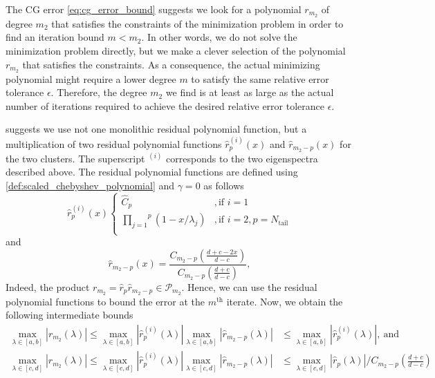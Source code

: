 The CG error \cref{eq:cg_error_bound} suggests we look for a polynomial $r_{m_2}$ of degree $m_2$ that satisfies the constraints of the minimization problem in order to find an iteration bound $m < m_2$. In other words, we do not solve the minimization problem directly, but we make a clever selection of the polynomial $r_{m_2}$ that satisfies the constraints. As a consequence, the actual minimizing polynomial might require a lower degree $m$ to satisfy the same relative error tolerance $\epsilon$. Therefore, the degree $m_2$ we find is at least as large as the actual number of iterations required to achieve the desired relative error tolerance $\epsilon$.

\citeauthor{cg_sharpened_convrate_Axelsson1976} suggests we use not one monolithic residual polynomial function, but a multiplication of two residual polynomial functions $\hat{r}^{(i)}_p(x)$ and $\hat{r}_{m_2-p}(x)$ for the two clusters. The superscript $^{(i)}$ corresponds to the two eigenspectra described above. The residual polynomial functions are defined using \cref{def:scaled_chebyshev_polynomial} and $\gamma = 0$ as follows
\begin{equation}
    \hat{r}^{(i)}_p (x)
    \begin{cases}
        \hat{C}_p                                            & , \text{if } i = 1                      \\
        \overset{p}{\underset{j=1}{\prod}} (1 - x/\lambda_j) & , \text{if } i = 2, p = N_{\text{tail}} \\
    \end{cases}
    \label{eq:residual_polynomial_rm}
\end{equation}
and
\begin{equation}
    \hat{r}_{{m_2}-p} (x) = \frac{C_{m_2-p} \left(\frac{d + c - 2x}{d - c}\right)}{C_{m_2-p}\left(\frac{d + c}{d - c}\right)},
    \label{eq:residual_polynomial_rpm}
\end{equation}
Indeed, the product $r_{m_2} = \hat{r}_p \hat{r}_{m_2-p} \in \mathcal{P}_{m_2}$. Hence, we can use the residual polynomial functions to bound the error at the $m^{\text{th}}$ iterate. Now, we obtain the following intermediate bounds
\begin{subequations}
    \begin{align}
        \max_{\lambda \in [a,b]} |r_{m_2}(\lambda)| \leq \max_{\lambda \in [a,b]} |\hat{r}^{(i)}_p(\lambda)| \max_{\lambda \in [a,b]} |\hat{r}_{m_2-p}(\lambda)| & \leq \max_{\lambda \in [a,b]} |\hat{r}^{(i)}_p(\lambda)|, \ \text{and} \label{eq:residual_polynomial_bound_ab}                     \\
        \max_{\lambda \in [c,d]} |r_{m_2}(\lambda)| \leq \max_{\lambda \in [c,d]} |\hat{r}^{(i)}_p(\lambda)| \max_{\lambda \in [c,d]} |\hat{r}_{m_2-p}(\lambda)| & \leq \max_{\lambda \in [c,d]} |\hat{r}_{p}(\lambda)|/C_{m_2-p}\left(\frac{d+c}{d-c}\right) \label{eq:residual_polynomial_bound_cd}
    \end{align}
\end{subequations}
